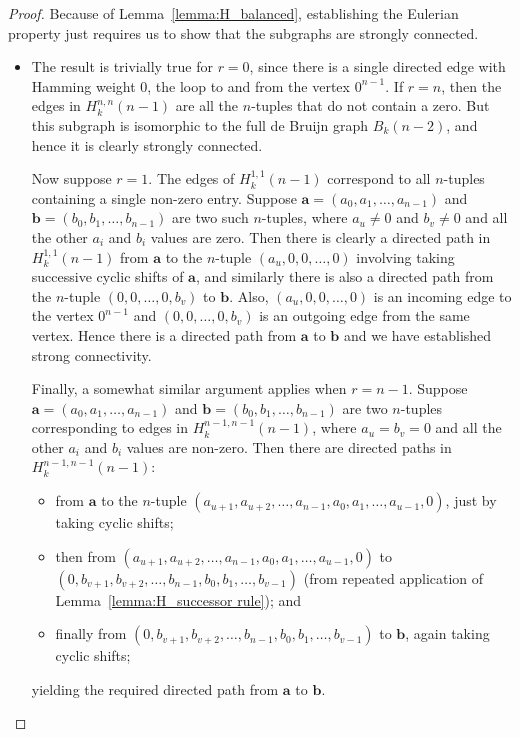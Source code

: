 \documentclass[a4paper,11pt]{article}
\theoremstyle{plain}
\theoremstyle{definition}
\theoremstyle{remark}
\begin{document}
\begin{proof}
Because of Lemma~\ref{lemma:H_balanced}, establishing the Eulerian property just requires us to
show that the subgraphs are strongly connected.
\begin{itemize}
\item[(i)] The result is trivially true for $r=0$, since there is a single directed edge with
    Hamming weight 0, the loop to and from the vertex $0^{n-1}$.  If $r=n$, then the edges in
    $H_k^{n,n}(n-1)$ are all the $n$-tuples that do not contain a zero. But this subgraph is
    isomorphic to the full de Bruijn graph $B_k(n-2)$, and hence it is clearly strongly
    connected.

Now suppose $r=1$.  The edges of $H_k^{1,1}(n-1)$ correspond to all $n$-tuples containing a
single non-zero entry.  Suppose $\mathbf{a}=(a_0,a_1,\dots,a_{n-1})$ and
$\mathbf{b}=(b_0,b_1,\dots,b_{n-1})$ are two such $n$-tuples, where $a_u\neq0$ and $b_v\neq0$
and all the other $a_i$ and $b_i$ values are zero. Then there is clearly a directed path in
$H_k^{1,1}(n-1)$ from $\mathbf{a}$ to the $n$-tuple $(a_u,0,0,\dots,0)$ involving taking
successive cyclic shifts of $\mathbf{a}$, and similarly there is also a directed path from the
$n$-tuple $(0,0,\dots,0,b_v)$ to $\mathbf{b}$. Also, $(a_u,0,0,\dots,0)$ is an incoming edge to
the vertex $0^{n-1}$ and $(0,0,\dots,0,b_v)$ is an outgoing edge from the same vertex. Hence
there is a directed path from $\mathbf{a}$ to $\mathbf{b}$ and we have established strong
connectivity.

Finally, a somewhat similar argument applies when $r=n-1$.  Suppose
$\mathbf{a}=(a_0,a_1,\dots,a_{n-1})$ and $\mathbf{b}=(b_0,b_1,\dots,b_{n-1})$ are two
$n$-tuples corresponding to edges in $H_k^{n-1,n-1}(n-1)$, where $a_u=b_v=0$ and all the other
$a_i$ and $b_i$ values are non-zero.  Then there are directed paths in $H_k^{n-1,n-1}(n-1)$:
\begin{itemize}
\item from $\mathbf{a}$ to the $n$-tuple
    $(a_{u+1},a_{u+2},\dots,a_{n-1},a_0,a_1,\dots,a_{u-1},0)$, just by taking cyclic
    shifts;
\item then from $(a_{u+1},a_{u+2},\dots,a_{n-1},a_0,a_1,\dots,a_{u-1},0)$ to
    \\$(0,b_{v+1},b_{v+2},\dots,b_{n-1},b_0,b_1,\dots,b_{v-1})$ (from repeated application of
    Lemma~\ref{lemma:H_successor rule}); and
\item finally from $(0,b_{v+1},b_{v+2},\dots,b_{n-1},b_0,b_1,\dots,b_{v-1})$ to
    $\mathbf{b}$, again taking cyclic shifts;
\end{itemize}
yielding the required directed path from $\mathbf{a}$ to $\mathbf{b}$.


\end{itemize}
\end{proof}
\end{document}
